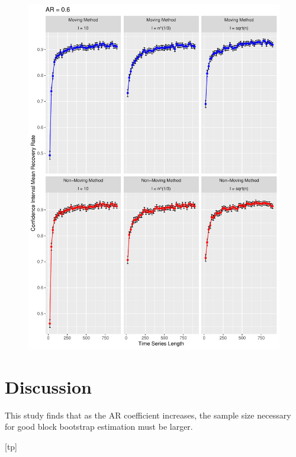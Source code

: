 \documentclass[12pt, letterpaper, titlepage]{article}
\begin{document}
\begin{figure}[p]
  \centering
  \includegraphics[width=\textwidth]{ar_0.6}
  \caption{}
  \label{fig:ar_0.6}
\end{figure}

%
%





\section{Discussion}
\label{sec:discuss}

This study finds that as the AR coefficient increases, the sample size necessary for good block bootstrap estimation must be larger.




[tp]
\end{document}
